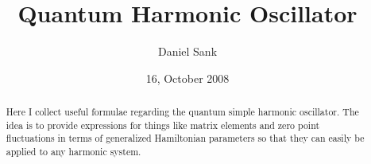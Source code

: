 \documentclass[12pt,twoside,aps,prl]{revtex4}
\begin{document}
\title{Quantum Harmonic Oscillator}

\author{Daniel Sank} 

\date{16, October 2008}
\begin{abstract}
Here I collect useful formulae regarding the quantum simple harmonic oscillator.
The idea is to provide expressions for things like matrix elements and zero point fluctuations in terms of generalized Hamiltonian parameters so that they can easily be applied to any harmonic system.
\end{abstract}
\maketitle







\end{document}
